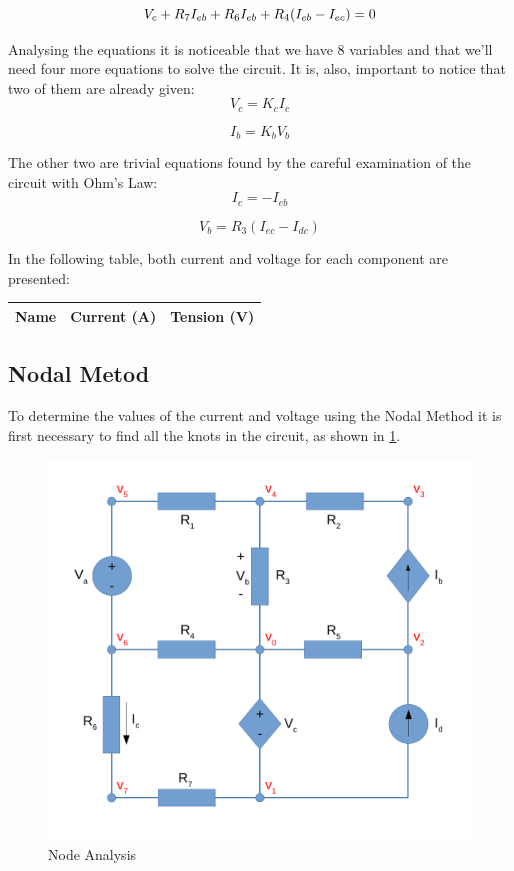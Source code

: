 \begin{equation}
     V_{c} + R_{7} I_{eb} + R_{6} I_{eb} + R_{4} (I_{eb} - I_{ec}) = 0
      \label{eq:KVL_{eb}}
\end{equation}

\vspace{0.1cm}
Analysing the equations it is noticeable that we have 8 variables and that we'll need four more equations to solve the circuit. It is, also, important to notice that two of them are already given:
\begin{equation}
    V_{c} = K_{c} I_{c}
\end{equation}

\begin{equation}
    I_{b} = K_{b} V_{b}
\end{equation}

\vspace{0.1cm}
The other two are trivial equations found by the careful examination of the circuit with Ohm's Law:
\vspace{0.1cm}
\begin{equation}
    I_{c} = -I_{eb}
\end{equation}

\begin{equation}
    V_{b} = R_{3} (I_{ec} - I_{dc})
\end{equation}

\pagebreak
In the following table, both current and voltage for each component are presented:
\begin{center}
\begin{tabular}{ |c|c|c| }
 \hline
\textbf{Name} & \textbf{Current (A)} & \textbf{Tension (V)} \\
 \hline
 
\end{tabular}
\end{center}

\subsection{Nodal Metod}
To determine the values of the current and voltage using the Nodal Method it is first necessary 
to find all the knots in the circuit, as shown in \ref{fig:NodeAnalysis}.

\begin{figure}[h] \centering
\includegraphics[width=0.4\linewidth]{NodeAnalysis.pdf}
\caption{Node Analysis}
\label{fig:NodeAnalysis}
\end{figure}


